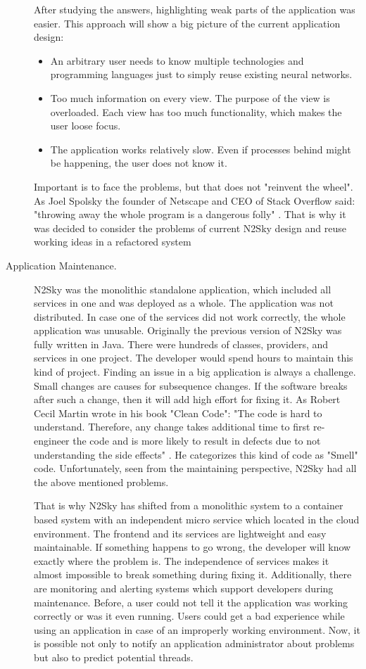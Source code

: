 \begin{description}
After studying the answers, highlighting weak parts of the application was easier. This approach will show a big picture of the current application design:

\begin{itemize}
\item An arbitrary user needs to know multiple technologies and programming languages just to simply reuse existing neural networks. 
\item Too much information on every view. The purpose of the view is overloaded. Each view has too much functionality, which makes the user loose focus.
\item The application works relatively slow. Even if processes behind might be happening, the user does not know it.
\end{itemize}

Important is to face the problems, but that does not "reinvent the wheel".  As Joel Spolsky the founder of Netscape and CEO of Stack Overflow said: "throwing away the whole program is a dangerous folly" \cite{joel}. That is why it was decided to consider the problems of current N2Sky design and reuse working ideas in a refactored system

\item[Application Maintenance.]
N2Sky was the monolithic standalone application, which included all services in one and was deployed as a whole. The application was not distributed. In case one of the services did not work correctly, the whole application was unusable. 
Originally the previous version of N2Sky was fully written in Java. There were hundreds of classes, providers, and services in one project. The developer would spend hours to maintain this kind of project. Finding an issue in a big application is always a challenge. Small changes are causes for subsequence changes. If the software breaks after such a change, then it will add high effort for fixing it. As Robert Cecil Martin wrote in his book "Clean Code": "The code is hard to understand. Therefore, any change takes additional time to first re-engineer the code and is more likely to result in defects due to not understanding the side effects" \cite{cleancode}.  He categorizes this kind of code as "Smell" code. Unfortunately, seen from the maintaining perspective, N2Sky had all the above mentioned problems.

That is why N2Sky has shifted from a monolithic system to a container based system with an independent micro service which located in the cloud environment. 
The frontend and its services are lightweight and easy maintainable. If something happens to go wrong, the developer will know exactly where the problem is. The independence of services makes it almost impossible to break something during fixing it. 
Additionally, there are monitoring and alerting systems which support developers during maintenance. Before, a user could not tell it the application was working correctly or was it even running. Users could get a bad experience while using an application in case of an improperly working environment. Now, it is possible not only to notify an application administrator about problems but also to predict potential threads. 
\end{description}


